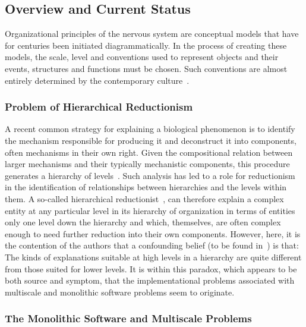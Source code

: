 \documentclass[10pt,letterpaper]{article}
\begin{document}
\subsection*{Overview and Current Status}

Organizational principles of the nervous system are conceptual models that have for centuries been initiated diagrammatically. In the process of creating these models, the scale, level and conventions used to represent objects and their events, structures and functions must be chosen. Such conventions are almost entirely determined by the contemporary culture~\cite{jacobson93,sperry80}.

\subsubsection*{Problem of Hierarchical Reductionism}
A recent common strategy for explaining a biological phenomenon is to identify the mechanism responsible for producing it and deconstruct it into components, often mechanisms in their own right. Given the compositional relation between larger mechanisms and their typically mechanistic components, this procedure generates a hierarchy of levels~\cite{bechtel22}. Such analysis has led to a role for reductionism in the identification of relationships between hierarchies and the levels within them. A so-called hierarchical reductionist~\cite{dawkins06}, can therefore explain a complex entity at any particular level in its hierarchy of organization in terms of entities only one level down the hierarchy and which, themselves, are often complex enough to need further reduction into their own components. However, here, it is the contention of the authors that a confounding belief (to be found in~\cite{dawkins06}) is that: The kinds of explanations suitable at high levels in a hierarchy are quite different from those suited for lower levels. It is within this paradox, which appears to be both source and symptom, that the implementational problems associated with multiscale and monolithic software problems seem to originate.  

\subsubsection*{The Monolithic Software and Multiscale Problems}
\end{document}
